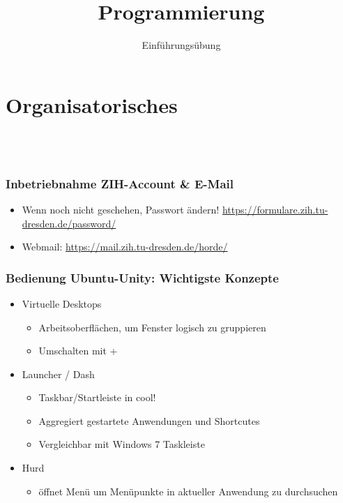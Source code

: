 
\title{Programmierung}
\subtitle{Einführungsübung}


    \begin{frame}
        \frontframe
    \end{frame}

    \section{Organisatorisches}\subsection{~}
    \begin{frame}
        \frametitle{Inbetriebnahme ZIH-Account \& E-Mail}
        \begin{itemize}
            \item Wenn noch nicht geschehen, Passwort ändern!
                \url{https://formulare.zih.tu-dresden.de/password/}
            \item Webmail: \url{https://mail.zih.tu-dresden.de/horde/}
        \end{itemize}
    \end{frame}

    \begin{frame}
        \frametitle{Bedienung Ubuntu-Unity: Wichtigste Konzepte}
        \begin{itemize}
            \item Virtuelle Desktops
                \begin{itemize}
                    \item Arbeitsoberflächen, um Fenster logisch zu gruppieren
                    \item Umschalten mit +
                \end{itemize}
            \pause
            \item Launcher / Dash
                \begin{itemize}
                    \item Taskbar/Startleiste in cool!
                    \item Aggregiert gestartete Anwendungen und Shortcutes
                    \item Vergleichbar mit Windows 7 Taskleiste
                \end{itemize}
            \pause
            \item Hurd
                \begin{itemize}
                    \item {} öffnet Menü um Menüpunkte in aktueller
                        Anwendung zu durchsuchen
                \end{itemize}
        \end{itemize}
    \end{frame}

